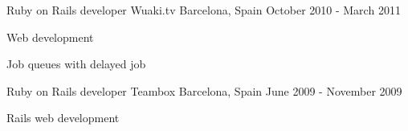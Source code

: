 \begin{cventries}
  \cventry
    {Ruby on Rails developer} %
    {Wuaki.tv} %
    {Barcelona, Spain} %
    {October 2010 - March 2011} %
    {
      \begin{cvitems} %
        \item {Web development}
        \item {Job queues with delayed job}
      \end{cvitems}
    }

  \cventry
    {Ruby on Rails developer} %
    {Teambox} %
    {Barcelona, Spain} %
    {June 2009 - November 2009} %
    {
      \begin{cvitems} %
        \item {Rails web development}
      \end{cvitems}
    }

\end{cventries}
